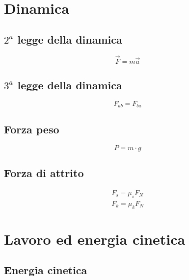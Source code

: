 \documentclass{article}
\begin{document}
\section{Dinamica}
\label{sec:din}

\subsection{$2^a$ legge della dinamica}
\label{sec:2leggedin}
\begin{equation}
  \label{eq:2leggedin}
  \vec{F}=m\vec{a}
\end{equation}

\subsection{$3^a$ legge della dinamica}
\label{sec:3leggedin}
\begin{equation}
  \label{eq:3leggedin}
  F_{ab}=F_{ba}
\end{equation}

\subsection{Forza peso}
\label{sec:forzapeso}

\begin{equation}
  \label{eq:fp}
  P=m\cdot g
\end{equation}

\subsection{Forza di attrito}
\label{sec:forzad}

\begin{eqnarray}
  \label{eq:fds}
  F_{s}=\mu_sF_N\\
  F_k=\mu_kF_N
\end{eqnarray}

\section{Lavoro ed energia cinetica}
\label{sec:lavoroenecin}

\subsection{Energia cinetica}
\label{sec:enecin}
\end{document}
